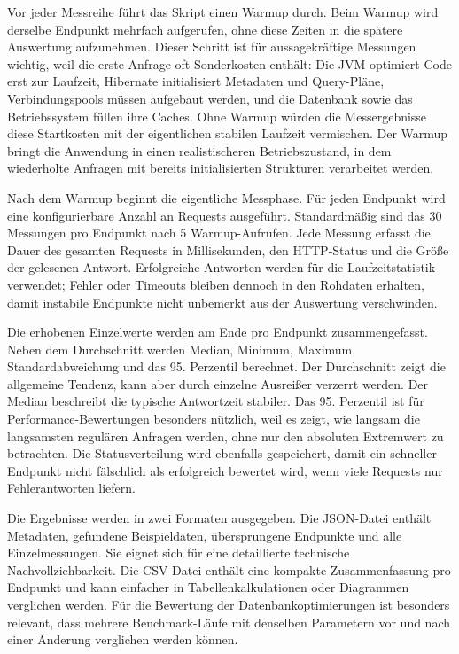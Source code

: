 Vor jeder Messreihe führt das Skript einen Warmup durch. Beim Warmup wird derselbe Endpunkt mehrfach aufgerufen, ohne diese Zeiten in die spätere Auswertung aufzunehmen. Dieser Schritt ist für aussagekräftige Messungen wichtig, weil die erste Anfrage oft Sonderkosten enthält: Die JVM optimiert Code erst zur Laufzeit, Hibernate initialisiert Metadaten und Query-Pläne, Verbindungspools müssen aufgebaut werden, und die Datenbank sowie das Betriebssystem füllen ihre Caches. Ohne Warmup würden die Messergebnisse diese Startkosten mit der eigentlichen stabilen Laufzeit vermischen. Der Warmup bringt die Anwendung in einen realistischeren Betriebszustand, in dem wiederholte Anfragen mit bereits initialisierten Strukturen verarbeitet werden.

Nach dem Warmup beginnt die eigentliche Messphase. Für jeden Endpunkt wird eine konfigurierbare Anzahl an Requests ausgeführt. Standardmäßig sind das 30 Messungen pro Endpunkt nach 5 Warmup-Aufrufen. Jede Messung erfasst die Dauer des gesamten Requests in Millisekunden, den HTTP-Status und die Größe der gelesenen Antwort. Erfolgreiche Antworten werden für die Laufzeitstatistik verwendet; Fehler oder Timeouts bleiben dennoch in den Rohdaten erhalten, damit instabile Endpunkte nicht unbemerkt aus der Auswertung verschwinden.

Die erhobenen Einzelwerte werden am Ende pro Endpunkt zusammengefasst. Neben dem Durchschnitt werden Median, Minimum, Maximum, Standardabweichung und das 95. Perzentil berechnet. Der Durchschnitt zeigt die allgemeine Tendenz, kann aber durch einzelne Ausreißer verzerrt werden. Der Median beschreibt die typische Antwortzeit stabiler. Das 95. Perzentil ist für Performance-Bewertungen besonders nützlich, weil es zeigt, wie langsam die langsamsten regulären Anfragen werden, ohne nur den absoluten Extremwert zu betrachten. Die Statusverteilung wird ebenfalls gespeichert, damit ein schneller Endpunkt nicht fälschlich als erfolgreich bewertet wird, wenn viele Requests nur Fehlerantworten liefern.

Die Ergebnisse werden in zwei Formaten ausgegeben. Die JSON-Datei enthält Metadaten, gefundene Beispieldaten, übersprungene Endpunkte und alle Einzelmessungen. Sie eignet sich für eine detaillierte technische Nachvollziehbarkeit. Die CSV-Datei enthält eine kompakte Zusammenfassung pro Endpunkt und kann einfacher in Tabellenkalkulationen oder Diagrammen verglichen werden. Für die Bewertung der Datenbankoptimierungen ist besonders relevant, dass mehrere Benchmark-Läufe mit denselben Parametern vor und nach einer Änderung verglichen werden können.

